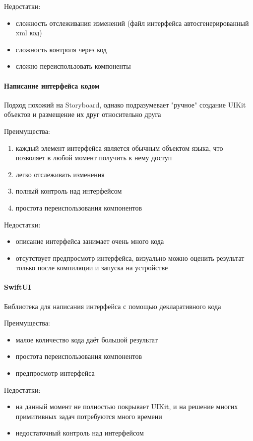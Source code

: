       \noindent Недостатки:
      \begin{itemize}
        \item сложность отслеживания изменений (файл интерфейса автосгенерированный xml код)
        \item сложность контроля через код
        \item сложно переиспользовать компоненты
      \end{itemize}



    \paragraph{Написание интерфейса кодом}
      Подход похожий на Storyboard, однако подразумевает "ручное" создание UIKit объектов и размещение их друг относительно друга

      \noindent Преимущества:
      \begin{enumerate}
        \item каждый элемент интерфейса является обычным объектом языка, что позволяет в любой момент получить к нему доступ
        \item легко отслеживать изменения
        \item полный контроль над интерфейсом
        \item простота переиспользования компонентов
      \end{enumerate}

      \noindent Недостатки:
      \begin{itemize}
        \item описание интерфейса занимает очень много кода
        \item отсутствует предпросмотр интерфейса, визуально можно оценить результат только после компиляции и запуска на устройстве
      \end{itemize}


    \paragraph{SwiftUI}
      Библиотека для написания интерфейса с помощью декларативного кода

      \noindent Преимущества:
      \begin{itemize}
        \item малое количество кода даёт большой результат
        \item простота переиспользования компонентов
        \item предпросмотр интерфейса
      \end{itemize}
      \noindent Недостатки:
      \begin{itemize}
        \item на данный момент не полностью покрывает UIKit, и на решение многих примитивных задач потребуются много времени
        \item недостаточный контроль над интерфейсом
      \end{itemize}


